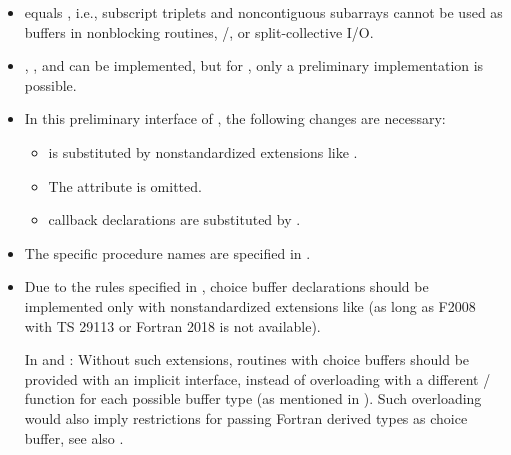 \begin{itemize}
  \begin{itemize}
   \item
        equals ,
       i.e., subscript triplets and noncontiguous subarrays cannot be used
       as buffers in nonblocking routines, \RMA/, or split-collective I/O.
   \item
       , , and  can be implemented,
       but for , only a preliminary implementation is possible.
   \item
       In this preliminary interface of , the following changes are
       necessary:
       \begin{itemize}
        \item {} is substituted by
              nonstandardized extensions like .
        \item The  attribute is omitted.
        \item {} callback declarations are
              substituted by .
       \end{itemize}
   \item
       The specific procedure names are specified in .
   \item
       Due to the rules specified in ,
       choice buffer declarations should be implemented only with
       nonstandardized extensions like 
       (as long as F2008 with TS 29113 or Fortran 2018 is not available).

       In  and :
       Without such extensions, routines with choice buffers
       should be provided with an implicit interface,
       instead of overloading with a different \MPI/ function
       for each possible buffer type (as mentioned in
       ).
       Such overloading would also imply restrictions
       for passing Fortran derived types as choice buffer, see also
       .


\end{itemize}
\end{itemize}
